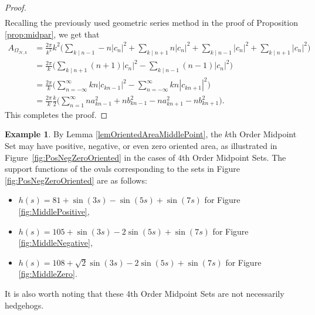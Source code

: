 \documentclass{amsart}
\theoremstyle{definition}
\newtheorem{ex}[thm]{Example}
\numberwithin{equation}{section}
\begin{document}
\begin{proof}
\begin{align*}
    \end{align*}
    Recalling the previously used geometric series method in the proof of Proposition \ref{prop:midpar}, we get that
    \begin{align*}
         A_{\Omega_{\mathcal{H},k}} &=  \frac{2\pi}{k^3}k^2\Bigg( \sum_{k\mid n-1} -n|c_n|^2 + \sum_{k\mid n+1} n|c_n|^2 +\sum_{k\mid n-1} |c_n|^2 + \sum_{k\mid n+1} |c_n|^2 \Bigg) \\&= \frac{2\pi}{k}\Bigg(  \sum_{k\mid n+1} (n+1)|c_n|^2 -\sum_{k\mid n-1} (n-1)|c_n|^2\Bigg)\\&=
         \frac{2\pi}{k}\Bigg(  \sum_{n=-\infty}^\infty kn|c_{kn-1}|^2 -\sum_{n=-\infty}^\infty kn|c_{kn+1}|^2\Bigg)  \\&= \frac{2\pi}{k}\frac{k}{2}\Bigg(  \sum_{n=1}^\infty na_{kn-1}^2+nb_{kn-1}^2 -na_{kn+1}^2-nb_{kn+1}^2\Bigg).
    \end{align*}
    This completes the proof.
\end{proof}

\begin{ex}
By Lemma \ref{lemOrientedAreaMiddlePoint}, the $k$th Order Midpoint Set may have positive, negative, or even zero oriented area, as illustrated in Figure~\ref{fig:PosNegZeroOriented} in the cases of $4$th Order Midpoint Sets.
 The support functions of the ovals corresponding to the sets in Figure \ref{fig:PosNegZeroOriented} are as follows:
\begin{itemize}
    \item $h(s)=81+\sin(3s)-\sin(5s)+\sin(7s)$ for Figure \ref{fig:MiddlePositive},
    \item $h(s)=105+\sin (3s)-2\sin(5s)+\sin(7s)$ for Figure \ref{fig:MiddleNegative},
    \item $h(s)=108+\sqrt{2}\sin (3s)-2\sin (5s)+\sin (7s)$ for Figure \ref{fig:MiddleZero}.
\end{itemize}

It is also worth noting that these 4th Order Midpoint Sets are not necessarily hedgehogs.
    
\end{ex}
\end{document}

